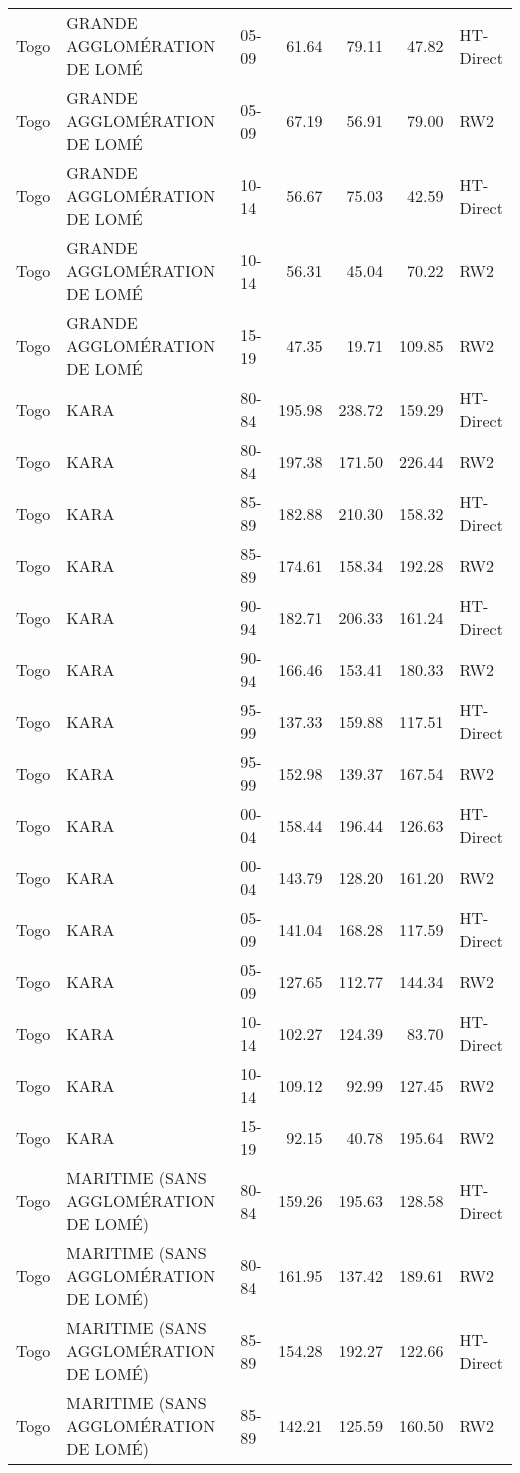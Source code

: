 \begin{longtable}{lllrrrl}
  Togo & GRANDE AGGLOMÉRATION DE LOMÉ & 05-09 & 61.64 & 79.11 & 47.82 & HT-Direct \\ 
  Togo & GRANDE AGGLOMÉRATION DE LOMÉ & 05-09 & 67.19 & 56.91 & 79.00 & RW2 \\ 
  Togo & GRANDE AGGLOMÉRATION DE LOMÉ & 10-14 & 56.67 & 75.03 & 42.59 & HT-Direct \\ 
  Togo & GRANDE AGGLOMÉRATION DE LOMÉ & 10-14 & 56.31 & 45.04 & 70.22 & RW2 \\ 
  Togo & GRANDE AGGLOMÉRATION DE LOMÉ & 15-19 & 47.35 & 19.71 & 109.85 & RW2 \\ 
  Togo & KARA & 80-84 & 195.98 & 238.72 & 159.29 & HT-Direct \\ 
  Togo & KARA & 80-84 & 197.38 & 171.50 & 226.44 & RW2 \\ 
  Togo & KARA & 85-89 & 182.88 & 210.30 & 158.32 & HT-Direct \\ 
  Togo & KARA & 85-89 & 174.61 & 158.34 & 192.28 & RW2 \\ 
  Togo & KARA & 90-94 & 182.71 & 206.33 & 161.24 & HT-Direct \\ 
  Togo & KARA & 90-94 & 166.46 & 153.41 & 180.33 & RW2 \\ 
  Togo & KARA & 95-99 & 137.33 & 159.88 & 117.51 & HT-Direct \\ 
  Togo & KARA & 95-99 & 152.98 & 139.37 & 167.54 & RW2 \\ 
  Togo & KARA & 00-04 & 158.44 & 196.44 & 126.63 & HT-Direct \\ 
  Togo & KARA & 00-04 & 143.79 & 128.20 & 161.20 & RW2 \\ 
  Togo & KARA & 05-09 & 141.04 & 168.28 & 117.59 & HT-Direct \\ 
  Togo & KARA & 05-09 & 127.65 & 112.77 & 144.34 & RW2 \\ 
  Togo & KARA & 10-14 & 102.27 & 124.39 & 83.70 & HT-Direct \\ 
  Togo & KARA & 10-14 & 109.12 & 92.99 & 127.45 & RW2 \\ 
  Togo & KARA & 15-19 & 92.15 & 40.78 & 195.64 & RW2 \\ 
  Togo & MARITIME (SANS AGGLOMÉRATION DE LOMÉ) & 80-84 & 159.26 & 195.63 & 128.58 & HT-Direct \\ 
  Togo & MARITIME (SANS AGGLOMÉRATION DE LOMÉ) & 80-84 & 161.95 & 137.42 & 189.61 & RW2 \\ 
  Togo & MARITIME (SANS AGGLOMÉRATION DE LOMÉ) & 85-89 & 154.28 & 192.27 & 122.66 & HT-Direct \\ 
  Togo & MARITIME (SANS AGGLOMÉRATION DE LOMÉ) & 85-89 & 142.21 & 125.59 & 160.50 & RW2 \\ 

\end{longtable}
